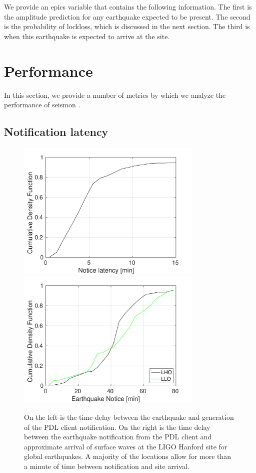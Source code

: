 \documentclass[reprint, prl, aps, showpacs]{revtex4-1}
\newcommand{\seismon}{\textnormal{seismon }}
\begin{document}
We provide an epics variable that contains the following information.
The first is the amplitude prediction for any earthquake expected to be present.
The second is the probability of lockloss, which is discussed in the next section.
The third is when this earthquake is expected to arrive at the site.

\section{Performance}
\label{sec:performance}

In this section, we provide a number of metrics by which we analyze the performance of \seismon.

\subsection{Notification latency}

\begin{figure}[t]
\hspace*{-0.5cm}
 \includegraphics[width=3.5in]{earthquake_notice.pdf}
 \includegraphics[width=3.5in]{lockloss_notice.pdf}
 \caption{On the left is the time delay between the earthquake and generation of the PDL client notification. On the right is the time delay between the earthquake notification from the PDL client and approximate arrival of surface waves at the LIGO Hanford site for global earthquakes. A majority of the locations allow for more than a minute of time between notification and site arrival.}
 \label{fig:delays}
\end{figure}
\end{document}
